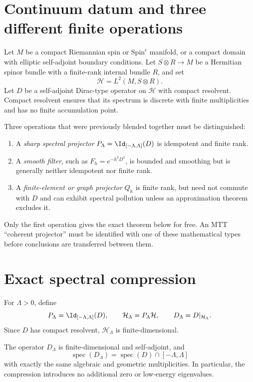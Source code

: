 \documentclass[11pt]{article}
\newcommand{\Hcal}{\mathcal H}
\newcommand{\specop}{\operatorname{spec}}
\begin{document}
\section{Continuum datum and three different finite operations}

Let \(M\) be a compact Riemannian spin or \(\mathrm{Spin}^c\) manifold, or a
compact domain with elliptic self-adjoint boundary conditions. Let
\(S\otimes R\to M\) be a Hermitian spinor bundle with a finite-rank internal
bundle \(R\), and set
\[
 \Hcal=L^2(M,S\otimes R).
\]
Let \(D\) be a self-adjoint Dirac-type operator on \(\Hcal\) with compact
resolvent. Compact resolvent ensures that its spectrum is discrete with finite
multiplicities and has no finite accumulation point.

Three operations that were previously blended together must be distinguished:
\begin{enumerate}
\item A \emph{sharp spectral projector}
  \(P_\Lambda=\Id_{[-\Lambda,\Lambda]}(D)\) is idempotent and finite rank.
\item A \emph{smooth filter}, such as
  \(F_h=e^{-h^2D^2}\), is bounded and smoothing but is generally neither
  idempotent nor finite rank.
\item A \emph{finite-element or graph projector} \(Q_h\) is finite rank, but
  need not commute with \(D\) and can exhibit spectral pollution unless an
  approximation theorem excludes it.
\end{enumerate}
Only the first operation gives the exact theorem below for free. An MTT
``coherent projector'' must be identified with one of these mathematical
types before conclusions are transferred between them.

\section{Exact spectral compression}

\begin{definition}
For \(\Lambda>0\), define
\[
 P_\Lambda=\Id_{[-\Lambda,\Lambda]}(D),
 \qquad
 \Hcal_\Lambda=P_\Lambda\Hcal,
 \qquad
 D_\Lambda=D|_{\Hcal_\Lambda}.
\]
Since \(D\) has compact resolvent, \(\Hcal_\Lambda\) is finite-dimensional.
\end{definition}

\begin{theorem}
\label{thm:spectral}
The operator \(D_\Lambda\) is finite-dimensional and self-adjoint, and
\[
 \specop(D_\Lambda)
 =
 \specop(D)\cap[-\Lambda,\Lambda]
\]
with exactly the same algebraic and geometric multiplicities. In particular,
the compression introduces no additional zero or low-energy eigenvalues.
\end{theorem}
\end{document}

